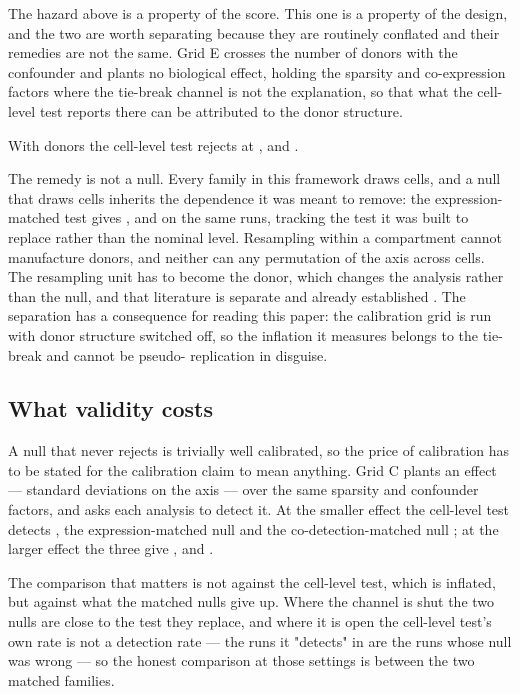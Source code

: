 \documentclass[11pt]{article}
\begin{document}
The hazard above is a property of the score. This one is a property of the
design, and the two are worth separating because they are routinely conflated
and their remedies are not the same. Grid E crosses the number of donors with
the confounder and plants no biological effect, holding the sparsity and
co-expression factors where the tie-break channel is not the explanation, so
that what the cell-level test reports there can be attributed to the donor
structure.

With \gridEDons{} donors the cell-level test rejects at \gridEDonACellcor,
\gridEDonBCellcor{} and \gridEDonCCellcor.

The remedy is not a null. Every family in this framework draws cells, and a null
that draws cells inherits the dependence it was meant to remove: the
expression-matched test gives \gridEDonAExpr, \gridEDonBExpr{} and
\gridEDonCExpr{} on the same runs, tracking the test it was built to replace
rather than the nominal level. Resampling within a compartment cannot
manufacture donors, and neither can any permutation of the axis across cells.
The resampling unit has to become the donor, which changes the analysis rather
than the null, and that literature is separate and already established
\citep{squair2021,zimmerman2021}. The separation has a consequence for reading
this paper: the calibration grid is run with donor structure switched off, so
the inflation it measures belongs to the tie-break and cannot be pseudo-
replication in disguise.

\subsection{What validity costs}

A null that never rejects is trivially well calibrated, so the price of
calibration has to be stated for the calibration claim to mean anything. Grid C
plants an effect --- \gridCEffs{} standard deviations on the axis --- over the
same sparsity and confounder factors, and asks each analysis to detect it. At
the smaller effect the cell-level test detects \gridCEffACellcor, the
expression-matched null \gridCEffAExpr{} and the co-detection-matched null
\gridCEffACodet; at the larger effect the three give \gridCEffBCellcor,
\gridCEffBExpr{} and \gridCEffBCodet.

The comparison that matters is not against the cell-level test, which is
inflated, but against what the matched nulls give up. Where the channel is shut
the two nulls are close to the test they replace, and where it is open the
cell-level test's own rate is not a detection rate --- the runs it "detects" in
are the runs whose null was wrong --- so the honest comparison at those settings
is between the two matched families.
\end{document}
